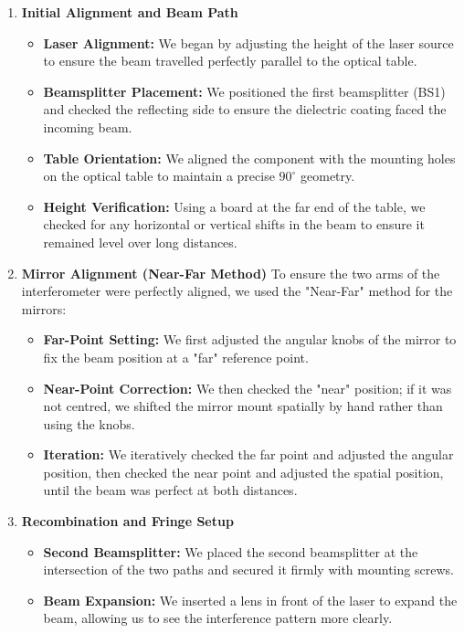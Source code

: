 \begin{enumerate}
    \item \textbf{Initial Alignment and Beam Path}
    \begin{itemize}
    \item \textbf{Laser Alignment:} We began by adjusting the height of the laser source to ensure the beam travelled perfectly parallel to the optical table.
    \item \textbf{Beamsplitter Placement:} We positioned the first beamsplitter (BS1) and checked the reflecting side to ensure the dielectric coating faced the incoming beam.
    \item \textbf{Table Orientation:} We aligned the component with the mounting holes on the optical table to maintain a precise $90^\circ$ geometry.
    \item \textbf{Height Verification:} Using a board at the far end of the table, we checked for any horizontal or vertical shifts in the beam to ensure it remained level over long distances.
\end{itemize}
    \item \textbf{Mirror Alignment (Near-Far Method)} To ensure the two arms of the interferometer were perfectly aligned, we used the "Near-Far" method for the mirrors:
    \begin{itemize}
        \item \textbf{Far-Point Setting:} We first adjusted the angular knobs of the mirror to fix the beam position at a "far" reference point.
        \item \textbf{Near-Point Correction:} We then checked the "near" position; if it was not centred, we shifted the mirror mount spatially by hand rather than using the knobs.
        \item \textbf{Iteration:} We iteratively checked the far point and adjusted the angular position, then checked the near point and adjusted the spatial position, until the beam was perfect at both distances.
    \end{itemize}
    \item \textbf{Recombination and Fringe Setup}
    \begin{itemize}
        \item \textbf{Second Beamsplitter:} We placed the second beamsplitter at the intersection of the two paths and secured it firmly with mounting screws.
        \item \textbf{Beam Expansion:} We inserted a lens in front of the laser to expand the beam, allowing us to see the interference pattern more clearly.

\end{itemize}
\end{enumerate}
